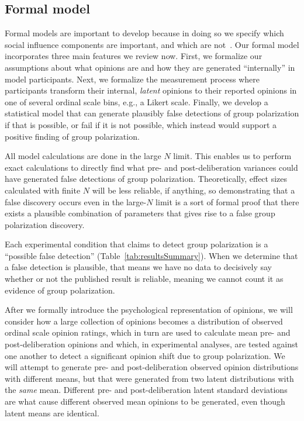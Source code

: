 \subsection{Formal model}

Formal models are important to develop because in doing so 
we specify which social influence components 
are important, and which are not~\cite{Kauffman1970,Cartwright1999}. 
Our formal model incorporates three 
main features we review now. First, we
formalize our assumptions about what opinions are and how they are generated
``internally'' in model participants. Next, we formalize the measurement
process where participants transform their internal, \emph{latent} opinions to
their reported opinions in one of several ordinal scale bins, e.g., a Likert
scale. Finally, we develop a statistical model that can generate plausibly
false detections of group polarization if that is possible, or fail if it is
not possible, which instead would support a positive finding of group 
polarization. 

All model calculations are done in the large $N$ limit. This enables us to 
perform exact calculations to directly find what pre- and post-deliberation variances
could have generated false detections of group polarization. 
Theoretically, effect sizes calculated with finite $N$ will be less reliable, if
anything, so demonstrating that a false discovery occurs even in the large-$N$
limit is a sort of formal proof that there exists a plausible
combination of parameters that gives rise to a false group polarization discovery.

Each experimental condition that claims to detect group polarization
is a ``possible false detection'' (Table~\ref{tab:resultsSummary}). 
When we determine that a false detection is plausible, that means we have no
data to decisively say whether or not the published result is reliable, 
meaning we cannot count it as evidence of group polarization.

After we formally introduce the psychological representation of opinions, we
will consider how a large collection of opinions becomes a distribution of
observed ordinal scale opinion ratings, which in turn are used to calculate
mean pre- and post-deliberation opinions and which, in experimental analyses,
are tested against one another to detect a significant opinion shift due to
group polarization. We will attempt to generate pre- and post-deliberation
observed opinion distributions with different means, but that were 
generated from two latent distributions with the \emph{same} mean. 
Different pre- and post-deliberation latent standard deviations are what
cause different observed mean opinions to be generated, 
even though latent means are identical.

